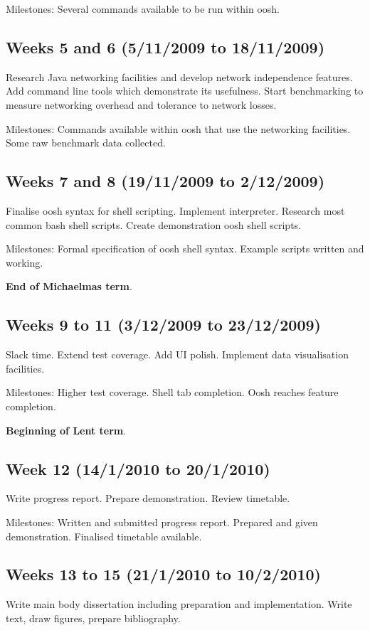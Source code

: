 \documentclass[12pt]{article}
\begin{document}
Milestones: Several commands available to be run within oosh.

\subsection*{Weeks 5 and 6 (5/11/2009 to 18/11/2009)}
Research Java networking facilities and develop network independence
features. Add command line tools which demonstrate its
usefulness. Start benchmarking to measure networking overhead and
tolerance to network losses.

Milestones: Commands available within oosh that use the networking
facilities. Some raw benchmark data collected.

\subsection*{Weeks 7 and 8 (19/11/2009 to 2/12/2009)}
Finalise oosh syntax for shell scripting. Implement
interpreter. Research most common bash shell scripts. Create
demonstration oosh shell scripts.

Milestones: Formal specification of oosh shell syntax. Example scripts
written and working.

{\bf End of Michaelmas term}.

\subsection*{Weeks 9 to 11 (3/12/2009 to 23/12/2009)}
Slack time. Extend test coverage. Add UI polish. Implement data
visualisation facilities.

Milestones: Higher test coverage. Shell tab completion. Oosh reaches
feature completion.

{\bf Beginning of Lent term}.

\subsection*{Week 12 (14/1/2010 to 20/1/2010)}
Write progress report. Prepare demonstration. Review timetable.

Milestones: Written and submitted progress report. Prepared and given
demonstration. Finalised timetable available.

\subsection*{Weeks 13 to 15 (21/1/2010 to 10/2/2010)}
Write main body dissertation including preparation and
implementation. Write text, draw figures, prepare bibliography.
\end{document}
